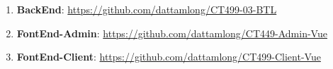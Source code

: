 {}
\setcounter{section}{6}
\setcounter{subsection}{0}


\begin{enumerate}
    \item \textbf{BackEnd}: \url{https://github.com/dattamlong/CT499-03-BTL}
    \item \textbf{FontEnd-Admin}: \url{https://github.com/dattamlong/CT449-Admin-Vue}
    \item \textbf{FontEnd-Client}: \url{https://github.com/dattamlong/CT499-Client-Vue}
\end{enumerate}


